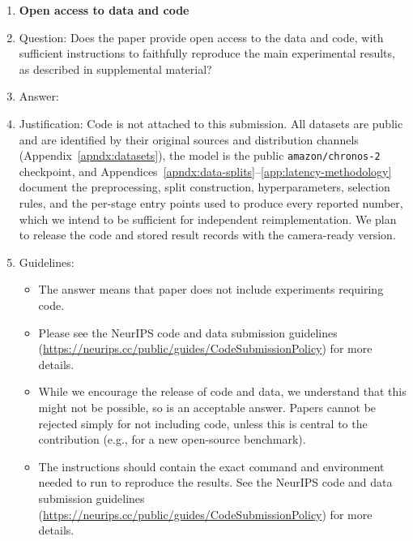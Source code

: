 \begin{enumerate}
\item {\bf Open access to data and code}
    \item[] Question: Does the paper provide open access to the data and code, with sufficient instructions to faithfully reproduce the main experimental results, as described in supplemental material?
    \item[] Answer: \answerNo{}
    \item[] Justification: Code is not attached to this submission. All datasets are public and are identified by their original sources and distribution channels (Appendix~\ref{apndx:datasets}), the model is the public \texttt{amazon/chronos-2} checkpoint, and Appendices~\ref{apndx:data-splits}--\ref{app:latency-methodology} document the preprocessing, split construction, hyperparameters, selection rules, and the per-stage entry points used to produce every reported number, which we intend to be sufficient for independent reimplementation. We plan to release the code and stored result records with the camera-ready version.
    \item[] Guidelines:
    \begin{itemize}
        \item The answer \answerNA{} means that paper does not include experiments requiring code.
        \item Please see the NeurIPS code and data submission guidelines (\url{https://neurips.cc/public/guides/CodeSubmissionPolicy}) for more details.
        \item While we encourage the release of code and data, we understand that this might not be possible, so \answerNo{} is an acceptable answer. Papers cannot be rejected simply for not including code, unless this is central to the contribution (e.g., for a new open-source benchmark).
        \item The instructions should contain the exact command and environment needed to run to reproduce the results. See the NeurIPS code and data submission guidelines (\url{https://neurips.cc/public/guides/CodeSubmissionPolicy}) for more details.

\end{itemize}
\end{enumerate}
